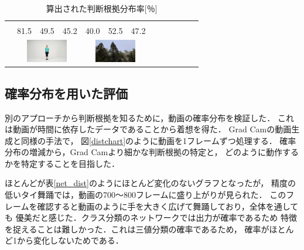 \begin{table}[t]
\begin{center}
\begin{tabular}{|c|p{5mm}p{5mm}p{5mm}|p{5mm}p{5mm}p{5mm}|p{5mm}p{5mm}p{5mm}|p{5mm}p{5mm}p{5mm}|}
        & \multicolumn{3}{|c|}{}
        & \multicolumn{3}{|c|}{}
      \\ \cline{2-13}
        &81.5 &49.5 &45.2 &40.0 &52.5 &47.2 & & & & & & \\
        & \multicolumn{3}{|c|}{\includegraphics[width=18mm]{images/snaps/shinkokyu.png}}
        & \multicolumn{3}{|c|}{\includegraphics[width=18mm]{images/snaps/leaves.png}}
        & \multicolumn{3}{|c|}{}
        & \multicolumn{3}{|c|}{}
      \\ \hline
    \end{tabular}
  \end{center}
  \caption{算出された判断根拠分布率[％]}
  \label{devide_summary}
\end{table}
\clearpage

\subsection{確率分布を用いた評価}
別のアプローチから判断根拠を知るために，動画の確率分布を検証した．
これは動画が時間に依存したデータであることから着想を得た．
Grad Camの動画生成と同様の手法で，
図\ref{distchart}のように動画を1フレームずつ処理する．
確率分布の増減から，Grad Camより細かな判断根拠の特定と，
どのように動作するかを特定することを目指した．

ほとんどが表\ref{net_dist}のようにほとんど変化のないグラフとなったが，
精度の低いタイ舞踊では，動画の700〜800フレームに盛り上がりが見られた．
このフレームを確認すると動画のように手を大きく広げて舞踊しており，全体を通しても
優美だと感じた．クラス分類のネットワークでは出力が確率であるため
特徴を捉えることは難しかった．これは三値分類の確率であるため，
確率がほとんど1から変化しないためである．

